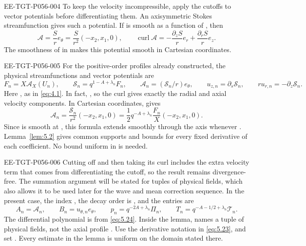 \begin{EESegment}{EE-TGT-P056-004}
To keep the velocity incompressible, apply the cutoffs to vector potentials before differentiating them. An axisymmetric
Stokes streamfunction  gives such a potential. If  is smooth as a
function of , then
\[
 \mathcal A=\frac Sr e_\theta=\frac S{r^2}(-x_2,x_1,0),
 \qquad
 \operatorname{curl}\mathcal A=-\frac{\partial_zS}{r}e_r+\frac{\partial_rS}{r}e_z.
\]
The smoothness of  in  makes this potential smooth in
Cartesian coordinates.
\end{EESegment}

\begin{EESegment}{EE-TGT-P056-005}
For the positive-order profiles already constructed, the physical streamfunctions and vector potentials are
\begin{equation}
 F_n=X\mathcal A_X(U_n),
 \qquad \mathcal S_n=q^{1-A+\lambda_n}F_n,
 \qquad \mathcal A_n=(\mathcal S_n/r)e_\theta,
 \qquad
 u_{z,n}=\partial_s\mathcal S_n,
 \qquad ru_{r,n}=-\partial_z\mathcal S_n.
 \tag{5.27}\label{eq:5.27}
\end{equation}
Here , as in \eqref{eq:4.1}. In fact,
, so the curl gives exactly the radial and
axial velocity components. In Cartesian coordinates,  gives
\[
 \mathcal A_n=\frac{\mathcal S_n}{r^2}(-x_2,x_1,0)
 =\frac12q^{-A+\lambda_n}\frac{F_n}{X}(-x_2,x_1,0).
\]
Since  is smooth at , this formula extends smoothly through the
axis whenever . Lemma~\ref{lem:5.2} gives common supports and bounds for every fixed derivative
of each coefficient. No bound uniform in  is needed.
\end{EESegment}

\begin{EESegment}{EE-TGT-P056-006}
Cutting off  and then taking its curl includes the extra velocity term that comes from
differentiating the cutoff, so the result remains divergence-free. The summation argument will be stated for tuples of
physical fields, which also allows it to be used later for the wave and mean correction sequence. In the present case,
the index , the decay order is , and the entries are
\[
 A_n=\mathcal A_n,
 \qquad B_n=u_{\theta,n}e_\theta,
 \qquad p_n=q^{-2A+\lambda_n}\Pi_n,
 \qquad T_n=q^{-A-1/2+\lambda_n}\mathcal T_n.
\]
The differential polynomial is  from \eqref{eq:5.24}. Inside the lemma,
 names a tuple of physical fields, not the axial profile
. Use the derivative notation in \eqref{eq:5.23}, and set
. Every estimate in the lemma is uniform on the domain stated there.
\end{EESegment}

